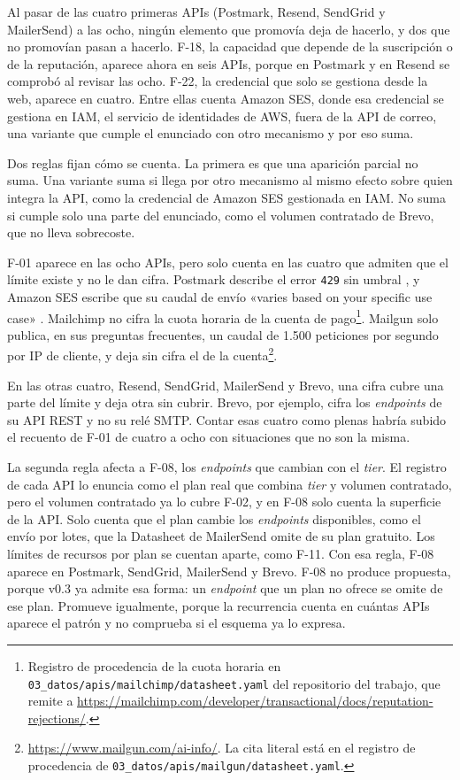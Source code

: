 Al pasar de las cuatro primeras APIs (Postmark, Resend, SendGrid y MailerSend) a las ocho, ningún elemento que promovía deja de hacerlo, y dos que no promovían pasan a hacerlo.
F-18, la capacidad que depende de la suscripción o de la reputación, aparece ahora en seis APIs, porque en Postmark y en Resend se comprobó al revisar las ocho.
F-22, la credencial que solo se gestiona desde la web, aparece en cuatro.
Entre ellas cuenta Amazon SES, donde esa credencial se gestiona en IAM, el servicio de identidades de AWS, fuera de la API de correo, una variante que cumple el enunciado con otro mecanismo y por eso suma.

Dos reglas fijan cómo se cuenta.
La primera es que una aparición parcial no suma.
Una variante suma si llega por otro mecanismo al mismo efecto sobre quien integra la API, como la credencial de Amazon SES gestionada en IAM.
No suma si cumple solo una parte del enunciado, como el volumen contratado de Brevo, que no lleva sobrecoste.

F-01 aparece en las ocho APIs, pero solo cuenta en las cuatro que admiten que el límite existe y no le dan cifra.
Postmark describe el error \texttt{429} sin umbral \citep{postmarkapi}, y Amazon SES escribe que su caudal de envío «varies based on your specific use case» \citep{sesdocs}.
Mailchimp no cifra la cuota horaria de la cuenta de pago\footnote{Registro de procedencia de la cuota horaria en \texttt{03\_datos/\allowbreak apis/\allowbreak mailchimp/\allowbreak datasheet.yaml} del repositorio del trabajo, que remite a \url{https://mailchimp.com/developer/transactional/docs/reputation-rejections/}.}.
Mailgun solo publica, en sus preguntas frecuentes, un caudal de 1.500 peticiones por segundo por IP de cliente, y deja sin cifra el de la cuenta\footnote{\url{https://www.mailgun.com/ai-info/}. La cita literal está en el registro de procedencia de \texttt{03\_datos/apis/mailgun/datasheet.yaml}.}.

En las otras cuatro, Resend, SendGrid, MailerSend y Brevo, una cifra cubre una parte del límite y deja otra sin cubrir.
Brevo, por ejemplo, cifra los \textit{endpoints} de su API REST y no su relé SMTP.
Contar esas cuatro como plenas habría subido el recuento de F-01 de cuatro a ocho con situaciones que no son la misma.

La segunda regla afecta a F-08, los \textit{endpoints} que cambian con el \textit{tier}.
El registro de cada API lo enuncia como el plan real que combina \textit{tier} y volumen contratado, pero el volumen contratado ya lo cubre F-02, y en F-08 solo cuenta la superficie de la API.
Solo cuenta que el plan cambie los \textit{endpoints} disponibles, como el envío por lotes, que la Datasheet de MailerSend omite de su plan gratuito.
Los límites de recursos por plan se cuentan aparte, como F-11.
Con esa regla, F-08 aparece en Postmark, SendGrid, MailerSend y Brevo.
F-08 no produce propuesta, porque v0.3 ya admite esa forma: un \textit{endpoint} que un plan no ofrece se omite de ese plan.
Promueve igualmente, porque la recurrencia cuenta en cuántas APIs aparece el patrón y no comprueba si el esquema ya lo expresa.

